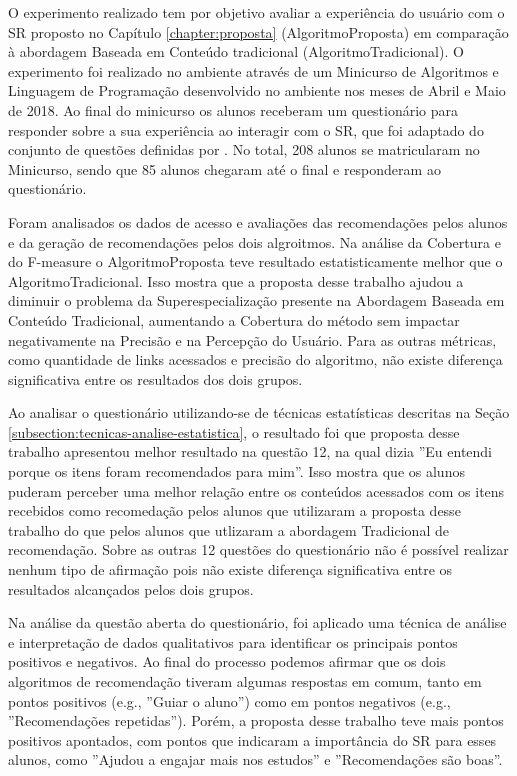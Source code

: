 O experimento realizado tem por objetivo avaliar a experiência do usuário com o SR proposto no Capítulo \ref{chapter:proposta}
(AlgoritmoProposta) em comparação à abordagem Baseada em Conteúdo tradicional (AlgoritmoTradicional). O experimento foi
realizado no ambiente \adaptwebspace através de um Minicurso de Algoritmos e Linguagem de Programação desenvolvido no
ambiente nos meses de Abril e Maio de 2018. Ao final do minicurso os alunos receberam um questionário para responder
sobre a sua experiência ao interagir com o SR, que foi adaptado do conjunto de questões definidas por
. No total, 208 alunos se matricularam no Minicurso, sendo que 85 alunos chegaram até o final e
responderam ao questionário.

Foram analisados os dados de acesso e avaliações das recomendações pelos alunos e da geração de recomendações pelos dois
algroitmos. Na análise da Cobertura e do F-measure o AlgoritmoProposta teve resultado estatisticamente melhor que
o AlgoritmoTradicional. Isso mostra que a proposta desse trabalho ajudou a diminuir o problema da Superespecialização
presente na Abordagem Baseada em Conteúdo Tradicional, aumentando a Cobertura do método sem impactar negativamente na
Precisão e na  Percepção do Usuário. Para as outras métricas, como quantidade de links acessados e precisão do
algoritmo, não existe diferença significativa entre os resultados dos dois grupos.

Ao analisar o questionário utilizando-se de técnicas estatísticas descritas na Seção \ref{subsection:tecnicas-analise-estatistica},
o resultado foi que proposta desse trabalho apresentou melhor resultado na questão 12, na qual dizia
''Eu entendi porque os itens foram recomendados para mim''. Isso mostra que os alunos puderam perceber uma melhor relação
entre os conteúdos acessados com os itens recebidos como recomedação pelos alunos que utilizaram a proposta desse trabalho
do que pelos alunos que utlizaram a abordagem Tradicional de recomendação. Sobre as outras 12 questões do questionário
não é possível realizar nenhum tipo de afirmação pois não existe diferença significativa entre os resultados
alcançados pelos dois grupos.

Na análise da questão aberta do questionário, foi aplicado uma técnica de análise e interpretação de dados qualitativos
para identificar os principais pontos positivos e negativos. Ao final do processo podemos afirmar que os dois algoritmos
de recomendação tiveram algumas respostas em comum, tanto em pontos positivos (e.g., ''Guiar o aluno'') como em pontos
negativos (e.g., ''Recomendações repetidas''). Porém, a proposta desse trabalho teve mais pontos positivos apontados,
com pontos que indicaram a importância do SR para esses alunos, como ''Ajudou a engajar mais nos estudos'' e ''Recomendações são boas''.


